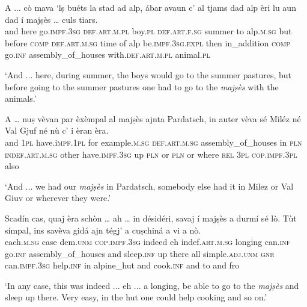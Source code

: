 \begin{linenumbers}
	\gll  A ... cò mava `lṣ buéts la stad ad alp, ábar avaun c’ al tjams dad alp èri lu aun dad í majṣès … culs tiars.  \\
and {} here go.\textsc{impf.3sg} \textsc{def.art.m.pl} boy.\textsc{pl} \textsc{def.art.f.sg} summer to alp.\textsc{m.sg} but before \textsc{comp} \textsc{def.art.m.sg} time of alp be.\textsc{impf.3sg.expl} then in\_addition \textsc{comp} go.\textsc{inf} assembly\_of\_houses {} with.\textsc{def.art.m.pl} animal.\textsc{pl}\\
\end{linenumbers}
\medskip
\glt `And ... here, during summer, the boys would go to the summer pastures, but before going to the summer pastures one had to go to the \textit{majṣès} with the animals.'
\medskip

\begin{linenumbers}
	\gll A … nuṣ vèvan par èxèmpal al majṣès ajnta Pardatsch, in auter vèva sé Miléz né Val Gjuf né nù c’ i èran èra.\\
	and {} \textsc{1pl} have.i\textsc{mpf.1pl} for example.\textsc{m.sg} \textsc{def.art.m.sg}  assembly\_of\_houses in \textsc{pln}  \textsc{indef.art.m.sg} other have.\textsc{impf.3sg} up \textsc{pln} or \textsc{pln} {} or where \textsc{rel} \textsc{3pl} \textsc{cop.impf.3pl} also \\
\end{linenumbers}
\medskip
\glt `And ... we had our \textit{majṣès} in Pardatsch, somebody else had it in Milez or Val Giuv or wherever they were.'
\medskip

\begin{linenumbers}
	\gll Scadín cas, quaj èra schòn … ah … in désidéri, savaj í majṣès a durmí sé lò. Tùt símpal, ins savèva gidá ajn tégj’ a cuṣchiná a vi a nò.\\
	each.\textsc{m.sg} case dem.\textsc{unm} \textsc{cop.impf.3sg} indeed {} eh {} indef.\textsc{art.m.sg} longing can.\textsc{inf} go.\textsc{inf} assembly\_of\_houses and sleep.\textsc{inf} up there all simple.\textsc{adj.unm} \textsc{gnr} can.\textsc{impf.3sg} help.\textsc{inf} in alpine\_hut and cook.\textsc{inf} and to and fro\\
\end{linenumbers}
\medskip
\glt `In any case, this was indeed ... eh ... a longing, be able to go to the \textit{majṣès} and sleep up there. Very easy, in the hut one could help cooking and so on.'
\medskip


